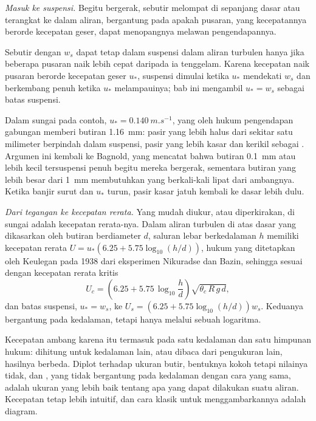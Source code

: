 \emph{Masuk ke suspensi.} Begitu bergerak, sebutir melompat di sepanjang dasar atau terangkat ke dalam aliran, bergantung pada apakah pusaran, yang kecepatannya berorde kecepatan geser, dapat menopangnya melawan pengendapannya.

\begin{proposition}\label{prop:b1:erosion-transport:suspension}
Sebutir dengan  $w_s$ dapat tetap dalam suspensi dalam aliran turbulen hanya jika beberapa pusaran naik lebih cepat daripada ia tenggelam. Karena kecepatan naik pusaran berorde kecepatan geser $u_*$, suspensi dimulai ketika $u_*$ mendekati $w_s$ dan berkembang penuh ketika $u_*$ melampauinya; bab ini mengambil $u_* = w_s$ sebagai batas suspensi.
\end{proposition}
\admitted

Dalam sungai pada contoh, $u_* = \qty{0.140}{m.s^{-1}}$, yang oleh hukum pengendapan gabungan memberi butiran \qty{1.16}{mm}: pasir yang lebih halus dari sekitar satu milimeter berpindah dalam suspensi, pasir yang lebih kasar dan kerikil sebagai . Argumen ini kembali ke Bagnold, yang mencatat bahwa butiran \qty{0.1}{mm} atau lebih kecil tersuspensi penuh begitu mereka bergerak, sementara butiran yang lebih besar dari \qty{1}{mm} membutuhkan  yang berkali-kali lipat dari ambangnya. Ketika banjir surut dan $u_*$ turun, pasir kasar jatuh kembali ke dasar lebih dulu.

\emph{Dari tegangan ke kecepatan rerata.} Yang mudah diukur, atau diperkirakan, di sungai adalah kecepatan rerata-nya. Dalam aliran turbulen di atas dasar yang dikasarkan oleh butiran berdiameter $d$, saluran lebar berkedalaman $h$ memiliki kecepatan rerata $U = u_*\left(6.25 + 5.75\log_{10}(h/d)\right)$, hukum yang ditetapkan oleh Keulegan pada 1938 dari eksperimen Nikuradse dan Bazin, sehingga  sesuai dengan kecepatan rerata kritis
\[
  U_c = \left(6.25 + 5.75\,\log_{10}\frac{h}{d}\right)\sqrt{\theta_c\,R\,g\,d},
\]
dan batas suspensi, $u_* = w_s$, ke $U_s = \left(6.25 +
5.75\log_{10}(h/d)\right) w_s$. Keduanya bergantung pada kedalaman, tetapi hanya melalui sebuah logaritma.

Kecepatan ambang karena itu termasuk pada satu kedalaman dan satu himpunan hukum: dihitung untuk kedalaman lain, atau dibaca dari pengukuran lain, hasilnya berbeda. Diplot terhadap ukuran butir, bentuknya kokoh tetapi nilainya tidak, dan , yang tidak bergantung pada kedalaman dengan cara yang sama, adalah ukuran yang lebih baik tentang apa yang dapat dilakukan suatu aliran. Kecepatan tetap lebih intuitif, dan cara klasik untuk menggambarkannya adalah diagram.

